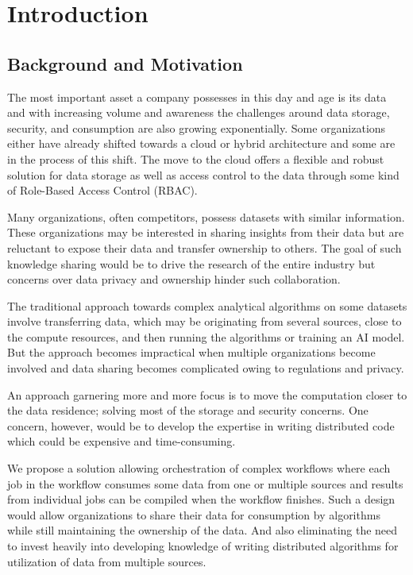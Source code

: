 
\chapter{Introduction}
\label{ch:intro}
\section{Background and Motivation}
The most important asset a company possesses in this day and age is its data and with increasing volume and awareness the challenges around data storage, security, and consumption are also growing exponentially. Some organizations either have already shifted towards a cloud or hybrid architecture and some are in the process of this shift. The move to the cloud offers a flexible and robust solution for data storage as well as access control to the data through some kind of Role-Based Access Control (RBAC).

\bigskip
Many organizations, often competitors, possess datasets with similar information. These organizations may be interested in sharing insights from their data but are reluctant to expose their data and transfer ownership to others. The goal of such knowledge sharing would be to drive the research of the entire industry but concerns over data privacy and ownership hinder such collaboration.

\bigskip
The traditional approach towards complex analytical algorithms on some datasets involve transferring data, which may be originating from several sources, close to the compute resources, and then running the algorithms or training an AI model. But the approach becomes impractical when multiple organizations become involved and data sharing becomes complicated owing to regulations and privacy.

\bigskip
An approach garnering more and more focus is to move the computation closer to the data residence; solving most of the storage and security concerns. One concern, however, would be to develop the expertise in writing distributed code which could be expensive and time-consuming.

\bigskip
We propose a solution allowing orchestration of complex workflows where each job in the workflow consumes some data from one or multiple sources and results from individual jobs can be compiled when the workflow finishes. Such a design would allow organizations to share their data for consumption by algorithms while still maintaining the ownership of the data. And also eliminating the need to invest heavily into developing knowledge of writing distributed algorithms for utilization of data from multiple sources.



